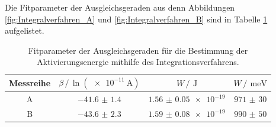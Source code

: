 \FloatBarrier
Die Fitparameter der Ausgleichsgeraden aus denn Abbildungen \ref{fig:Integralverfahren_A} und \ref{fig:Integralverfahren_B} sind 
in Tabelle \ref{tab:Fit_params_integtal} aufgelistet.
\begin{table}
    \centering
    \caption{Fitparameter der Ausgleichsgeraden für die Bestimmung der Aktivierungsenergie mithilfe des Integrationsverfahrens.}
    \label{tab:Fit_params_integtal}
    \begin{tabular}{c c c c}
        \toprule
        Messreihe&$\beta \,/\, \ln(\SI{e-11}{\ampere})$&$W \,/\,\SI{}{\joule}$&$W \,/\,\SI{}{\milli\eV}$\\
        \midrule
        A&$\num{-41.6(14)}$&$\num{1.56(5)e-19}$&$\num{971(30)}$\\
        B&$\num{-43.6(23)}$&$\num{1.59(8)e-19}$&$\num{990(50)}$\\
        \bottomrule
    \end{tabular}
\end{table}
\newpage
